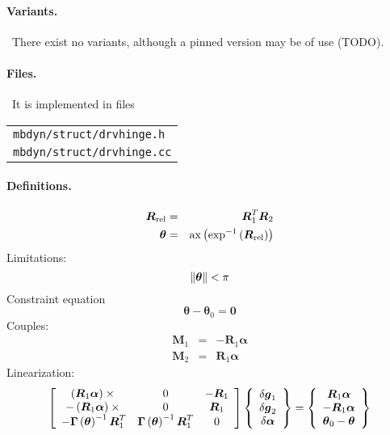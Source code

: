 \documentclass[10pt,dvips,fleqn,subeqn]{report}
\newcommand{\T}[1]{\boldsymbol{#1}}
\begin{document}
\paragraph{Variants.} \
There exist no variants, although a pinned version may be of use (TODO).

\paragraph{Files.} \
It is implemented in files

\begin{tabular}{l}
\texttt{mbdyn/struct/drvhinge.h} \\
\texttt{mbdyn/struct/drvhinge.cc}
\end{tabular}

\paragraph{Definitions.}
\begin{eqnarray*}
	\T{R}_{\text{rel}} & = & \T{R}_1^T \T{R}_2 \\
	\T{\theta} & = & \llk{ax}\plbr{\llk{exp}^{-1}\plbr{\T{R}_{\text{rel}}}}
\end{eqnarray*}
Limitations:
\begin{equation}
	\nrbr{\T{\theta}} < \pi
\end{equation}
Constraint equation 
\begin{equation}
	\T{\theta} - \T{\theta}_0 = \T{0}
\end{equation}
Couples:
\begin{eqnarray*}
	\T{M}_1 & = & -\T{R}_1 \T{\alpha} \\
	\T{M}_2 & = & \T{R}_1 \T{\alpha}
\end{eqnarray*}
Linearization:
\begin{equation}
	\sqbr{\matr{ccc}{
		\plbr{\T{R}_1 \T{\alpha}}\times{} & 0 & -\T{R}_1 \\
		-\plbr{\T{R}_1 \T{\alpha}}\times{} & 0 & \T{R}_1 \\
		-\T{\Gamma}\plbr{\T{\theta}}^{-1} \T{R}_1^T &
			\T{\Gamma}\plbr{\T{\theta}}^{-1} \T{R}_1^T & 0
	}}\cubr{\cvvect{
		\delta\T{g}_1 \\
		\delta\T{g}_2 \\
		\delta\T{\alpha} \\
	}} = \cubr{\cvvect{
		\T{R}_1 \T{\alpha} \\
		-\T{R}_1 \T{\alpha} \\
		\T{\theta}_0 - \T{\theta}
	}}
\end{equation}
\end{document}
